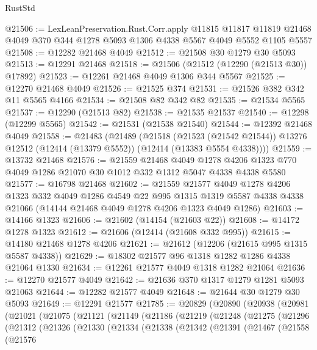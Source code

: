 \begin{lexlean}{RustStd}
\begin{coremodule}
{\begin{coremodule}
{{{{{{{{{{{{{{{{{{{{{{{{{{{{{{{{{{{{{{{{{{{{{{{{{{@21506 := LexLeanPreservation.Rust.Corr.apply
    @11815
    @11817
    @11819
    @21468
    @4049
    @370
    @344
    @1278
    @5093
    @1306
    @4338
    @5567
    @4049
    @5552
    @1105
    @5557
@21508 := @12282 @21468 @4049
@21512 := @21508 @30 @1279 @30 @5093
@21513 := @12291 @21468
@21518 := @21506 (@21512 (@12290 (@21513 @30)) @17892)
@21523 := @12261 @21468 @4049 @1306 @344 @5567
@21525 := @12270 @21468 @4049
@21526 := @21525 @374
@21531 := @21526 @382 @342 @11 @5565 @4166
@21534 := @21508 @82 @342 @82
@21535 := @21534 @5565
@21537 := @12290 (@21513 @82)
@21538 := @21535 @21537
@21540 := @12298 (@12299 @5565)
@21542 := @21531 (@21538 @21540)
@21544 := @12392 @21468 @4049
@21558 := @21483
    (@21489
      (@21518
        (@21523 (@21542 @21544))
        @13276
        @12512
        (@12414 (@13379 @5552))
        (@12414 (@13383 @5554 @4338))))
@21559 := @13732 @21468
@21576 := @21559
    @21468
    @4049
    @1278
    @4206
    @1323
    @770
    @4049
    @1286
    @21070
    @30
    @1012
    @332
    @1312
    @5047
    @4338
    @4338
    @5580
@21577 := @16798 @21468
@21602 := @21559
    @21577
    @4049
    @1278
    @4206
    @1323
    @332
    @4049
    @1286
    @4549
    @22
    @995
    @1315
    @1319
    @5587
    @4338
    @4338
    @21066
    (@14144 @21468 @4049 @1278 @4206 @1323 @4049 @1286)
@21603 := @14166 @1323
@21606 := @21602 (@14154 (@21603 @22))
@21608 := @14172 @1278 @1323
@21612 := @21606 (@12414 (@21608 @332 @995))
@21615 := @14180 @21468 @1278 @4206
@21621 := @21612 (@12206 (@21615 @995 @1315 @5587 @4338))
@21629 := @18302 @21577 @96 @1318 @1282 @1286 @4338 @21064 @1330
@21634 := @12261 @21577 @4049 @1318 @1282 @21064
@21636 := @12270 @21577 @4049
@21642 := @21636 @370 @1317 @1279 @1281 @5093 @21063
@21644 := @12282 @21577 @4049
@21648 := @21644 @30 @1279 @30 @5093
@21649 := @12291 @21577
@21785 := @20829
    (@20890
      (@20938
        (@20981
          (@21021
            (@21075
              (@21121
                (@21149
                  (@21186
                    (@21219
                      (@21248
                        (@21275
                          (@21296
                            (@21312
                              (@21326
                                (@21330
                                  (@21334
                                    (@21338
                                      (@21342
                                        (@21391
                                          (@21467
                                            (@21558
                                              (@21576
}}}}}}}}}}}}}}}}}}}}}}}}}}}}}}}}}}}}}}}}}}}}}}}}}}
\end{coremodule}}
\end{coremodule}
\end{lexlean}
